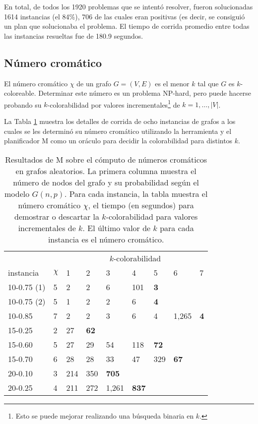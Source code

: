 En total, de todos los 1920 problemas que se intentó resolver, fueron
solucionadas 1614 instancias (el 84\%), 706 de las cuales eran positivas (es
decir, se consiguió un plan que solucionaba el problema. El tiempo de corrida
promedio entre todas las instancias resueltas fue de 180.9 segundos.

\subsection{Número cromático}

El número cromático $\chi$ de un grafo $G=(V,E)$ es el menor $k$ tal que $G$ es
$k$-coloreable. Determinar este número es un problema NP-hard, pero puede
hacerse probando su $k$-colorabilidad por valores incrementales\footnote{Esto
se puede mejorar realizando una búsqueda binaria en $k$.} de
$k=1,\ldots,|V|$.

La Tabla \ref{chromatic} muestra los detalles de corrida de ocho instancias de
grafos a los cuales se les determinó su número cromático utilizando la
herramienta y el planificador M como un oráculo para decidir
la colorabilidad para distintos $k$.

\begin{table}[h!]
\centering
\small
\begin{tabular}{lllllllll}
       &       & \multicolumn{7}{c}{$k$-colorabilidad} \\
\cmidrule(l){3-9}
instancia      & $\chi$ &     1 &     2 &     3 &     4 &     5 &     6 &     7 \\
\midrule
10-0.75 (1)      &      5 &     2 &     2 &     6 &   101 &\bf  3 &       &       \\
10-0.75 (2)      &      5 &     1 &     2 &     2 &     6 &\bf  4 &       &       \\
10-0.85        &      7 &     2 &     2 &     3 &     6 &     4 & 1,265 &\bf  4 \\
15-0.25        &      2 &    27 &\bf 62 &       &       &       &       &       \\
15-0.60        &      5 &    27 &    29 &    54 &   118 &\bf 72 &       &       \\
15-0.70        &      6 &    28 &    28 &    33 &    47 &   329 &\bf 67 &       \\
20-0.10        &      3 &   214 &   350 &\bf705 &       &       &       &       \\ %
20-0.25        &      4 &   211 &   272 & 1,261 &\bf837 &       &       &       \\
\midrule
\end{tabular}
\caption[Resultados de M sobre números cromáticos]{
Resultados de M sobre el cómputo de números cromáticos en grafos aleatorios.
La primera columna muestra el número de nodos del grafo y su probabilidad según
el modelo $G(n,p)$.
Para cada instancia, la tabla muestra el número cromático $\chi$, el tiempo
(en segundos) para demostrar o descartar la $k$-colorabilidad para valores
incrementales de $k$.
El último valor de $k$ para cada instancia es el número cromático.}
\label{chromatic}
\end{table}

